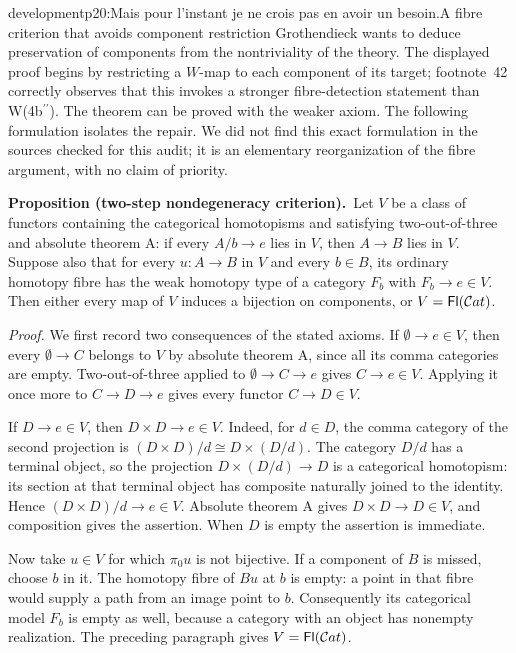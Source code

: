 \begin{dcomment}{development}{p20:Mais pour l'instant je ne crois pas en avoir un besoin.}{A fibre criterion that avoids component restriction}
Grothendieck wants to deduce preservation of components from the nontriviality of the theory. The displayed proof begins by restricting a \(W\)-map to each component of its target; footnote~42 correctly observes that this invokes a stronger fibre-detection statement than W(4b\(^{\prime\prime}\)). The theorem can be proved with the weaker axiom. The following formulation isolates the repair. We did not find this exact formulation in the sources checked for this audit; it is an elementary reorganization of the fibre argument, with no claim of priority.

\textbf{Proposition (two-step nondegeneracy criterion).}\ours\
Let \(V\) be a class of functors containing the categorical homotopisms and satisfying two-out-of-three and absolute theorem A: if every \(A/b\to e\) lies in \(V\), then \(A\to B\) lies in \(V\). Suppose also that for every \(u:A\to B\) in \(V\) and every \(b\in B\), its ordinary homotopy fibre has the weak homotopy type of a category \(F_b\) with \(F_b\to e\in V\). Then either every map of \(V\) induces a bijection on components, or \(V=\mathsf{Fl}(\mathcal{C}at)\).

\emph{Proof.}
We first record two consequences of the stated axioms. If \(\emptyset\to e\in V\), then every \(\emptyset\to C\) belongs to \(V\) by absolute theorem A, since all its comma categories are empty. Two-out-of-three applied to
\(\emptyset\to C\to e\) gives \(C\to e\in V\). Applying it once more to \(C\to D\to e\) gives every functor \(C\to D\in V\).

If \(D\to e\in V\), then \(D\times D\to e\in V\). Indeed, for \(d\in D\), the comma category of the second projection is
\((D\times D)/d\cong D\times(D/d)\).
The category \(D/d\) has a terminal object, so the projection \(D\times(D/d)\to D\) is a categorical homotopism: its section at that terminal object has composite naturally joined to the identity. Hence \((D\times D)/d\to e\in V\). Absolute theorem A gives \(D\times D\to D\in V\), and composition gives the assertion. When \(D\) is empty the assertion is immediate.

Now take \(u\in V\) for which \(\pi_0u\) is not bijective. If a component of \(B\) is missed, choose \(b\) in it. The homotopy fibre of \(Bu\) at \(b\) is empty: a point in that fibre would supply a path from an image point to \(b\). Consequently its categorical model \(F_b\) is empty as well, because a category with an object has nonempty realization. The preceding paragraph gives \(V=\mathsf{Fl}(\mathcal{C}at)\).


\end{dcomment}

